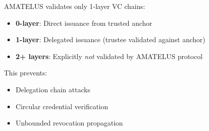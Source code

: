 AMATELUS validates only 1-layer VC chains:

\begin{itemize}
  \item \textbf{0-layer}: Direct issuance from trusted anchor
  \item \textbf{1-layer}: Delegated issuance (trustee validated against anchor)
  \item \textbf{2+ layers}: Explicitly \emph{not} validated by AMATELUS protocol
\end{itemize}

This prevents:
\begin{itemize}
  \item Delegation chain attacks
  \item Circular credential verification
  \item Unbounded revocation propagation
\end{itemize}

